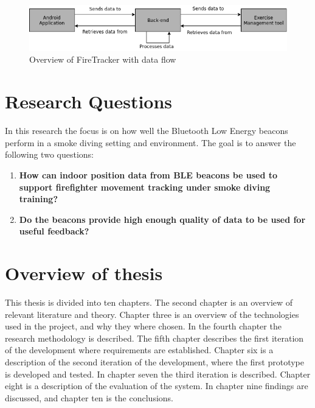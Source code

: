 \documentclass[../Main/thesis.tex]{subfiles}
\begin{document}
\begin{figure}[h]
	\centering
	\includegraphics[width=\textwidth]{../fig/system-overview}
	\caption{Overview of FireTracker with data flow}
	\label{fig:system-overview}
\end{figure}

\section{Research Questions}
\label{ch:reserch_questions}
In this research the focus is on how well the Bluetooth Low Energy beacons perform in a smoke diving setting and environment. 
The goal is to answer the following two questions:

\begin{enumerate}
	\item \textbf{How can indoor position data from BLE beacons be used to support firefighter movement tracking under smoke diving training?}
	\item \textbf{Do the beacons provide high enough quality of data to be used for useful feedback?}
\end{enumerate}


\section{Overview of thesis}
This thesis is divided into ten chapters.
The second chapter is an overview of relevant literature and theory.
Chapter three is an overview of the technologies used in the project, and why they where chosen.
In the fourth chapter the research methodology is described.
The fifth chapter describes the first iteration of the development where requirements are established.
Chapter six is a description of the second iteration of the development, where the first prototype is developed and tested.
In chapter seven the third iteration is described.
Chapter eight is a description of the evaluation of the system.
In chapter nine findings are discussed, and chapter ten is the conclusions.


\onlyinsubfile{}
\onlyinsubfile{}
\end{document}
